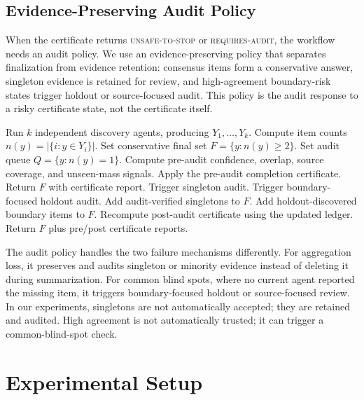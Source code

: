 \documentclass[letterpaper]{article}
\begin{document}
\subsection{Evidence-Preserving Audit Policy}

When the certificate returns \textsc{unsafe-to-stop} or
\textsc{requires-audit}, the workflow needs an audit policy. We use an
evidence-preserving policy that separates finalization from evidence retention:
consensus items form a conservative answer, singleton evidence is retained for
review, and high-agreement boundary-risk states trigger holdout or source-focused
audit. This policy is the audit response to a risky certificate state, not the
certificate itself.

\begin{algorithm}[H]
\caption{Evidence-Preserving Audit Policy}
\begin{algorithmic}[1]
\STATE Run $k$ independent discovery agents, producing $Y_1,\ldots,Y_k$.
\STATE Compute item counts $n(y)=|\{i:y\in Y_i\}|$.
\STATE Set conservative final set $F=\{y:n(y)\ge2\}$.
\STATE Set audit queue $Q=\{y:n(y)=1\}$.
\STATE Compute pre-audit confidence, overlap, source coverage, and unseen-mass signals.
\STATE Apply the pre-audit completion certificate.
    \STATE Return $F$ with certificate report.
\ENDIF
{}
    \STATE Trigger singleton audit.
\ENDIF
{}
    \STATE Trigger boundary-focused holdout audit.
\ENDIF
\STATE Add audit-verified singletons to $F$.
\STATE Add holdout-discovered boundary items to $F$.
\STATE Recompute post-audit certificate using the updated ledger.
\STATE Return $F$ plus pre/post certificate reports.
\end{algorithmic}
\end{algorithm}

The audit policy handles the two failure mechanisms differently. For aggregation
loss, it preserves and audits singleton or minority evidence instead of deleting
it during summarization. For common blind spots, where no current agent reported
the missing item, it triggers boundary-focused holdout or source-focused review.
In our experiments, singletons are not automatically accepted; they are retained
and audited. High agreement is not automatically trusted; it can trigger a
common-blind-spot check.

\section{Experimental Setup}
\end{document}
